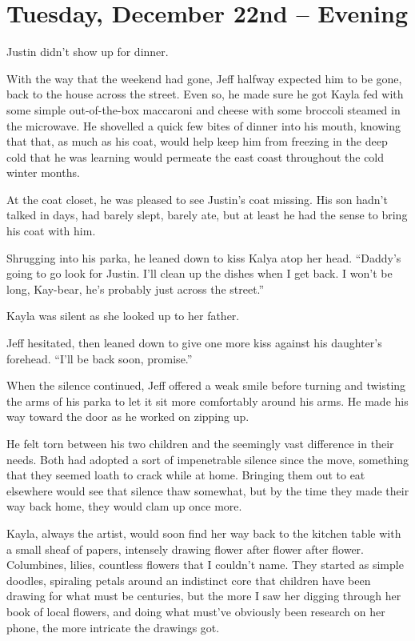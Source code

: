 \chapter{Tuesday, December 22nd -- Evening}

Justin didn't show up for dinner.

With the way that the weekend had gone, Jeff halfway expected him to be gone, back to the house across the street.  Even so, he made sure he got Kayla fed with some simple out-of-the-box maccaroni and cheese with some broccoli steamed in the microwave.  He shovelled a quick few bites of dinner into his mouth, knowing that that, as much as his coat, would help keep him from freezing in the deep cold that he was learning would permeate the east coast throughout the cold winter months.

At the coat closet, he was pleased to see Justin's coat missing.  His son hadn't talked in days, had barely slept, barely ate, but at least he had the sense to bring his coat with him.

Shrugging into his parka, he leaned down to kiss Kalya atop her head.  ``Daddy's going to go look for Justin.  I'll clean up the dishes when I get back.  I won't be long, Kay-bear, he's probably just across the street.''

Kayla was silent as she looked up to her father.

Jeff hesitated, then leaned down to give one more kiss against his daughter's forehead.  ``I'll be back soon, promise.''

When the silence continued, Jeff offered a weak smile before turning and twisting the arms of his parka to let it sit more comfortably around his arms.  He made his way toward the door as he worked on zipping up.

\secdiv

He felt torn between his two children and the seemingly vast difference in their needs.  Both had adopted a sort of impenetrable silence since the move, something that they seemed loath to crack while at home.  Bringing them out to eat elsewhere would see that silence thaw somewhat, but by the time they made their way back home, they would clam up once more.

Kayla, always the artist, would soon find her way back to the kitchen table with a small sheaf of papers, intensely drawing flower after flower after flower.  Columbines, lilies, countless flowers that I couldn't name.  They started as simple doodles, spiraling petals around an indistinct core that children have been drawing for what must be centuries, but the more I saw her digging through her book of local flowers, and doing what must've obviously been research on her phone, the more intricate the drawings got.

